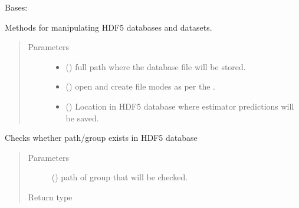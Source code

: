 \documentclass[letterpaper,10pt,english]{sphinxmanual}
\begin{document}
\begin{fulllineitems}
\label{\detokenize{shared:mleap.shared.files_io.FilesIO}}
Bases: 

Methods for manipulating HDF5 databases and datasets.
\begin{quote}\begin{description}
\item[{Parameters}] \leavevmode\begin{itemize}
\item {} 
 () \textendash{} full path where the database file will be stored.

\item {} 
 () \textendash{} open and create file modes as per the .

\item {} 
 () \textendash{} Location in HDF5 database where estimator predictions will be saved.

\end{itemize}

\end{description}\end{quote}

\begin{fulllineitems}
\label{\detokenize{shared:mleap.shared.files_io.FilesIO.check_h5_path_exists}}
Checks whether path/group exists in HDF5 database
\begin{quote}\begin{description}
\item[{Parameters}] \leavevmode
{} () \textendash{} path of group that will be checked.

\item[{Return type}] \leavevmode
{}


\end{description}
\end{quote}
\end{fulllineitems}
\end{fulllineitems}
\end{document}
